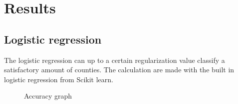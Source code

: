 \section{Results}
\setlength{\parindent}{0cm}
\subsection{Logistic regression}
The logistic regression can up to a certain regularization value classify a satisfactory amount of counties. The calculation are made with the built in logistic regression from Scikit learn.  
\\
\par

\begin{figure}[H]
  \centering
    \hfill
    \hfill
   \caption{Accuracy graph}
\end{figure}
\newpage
